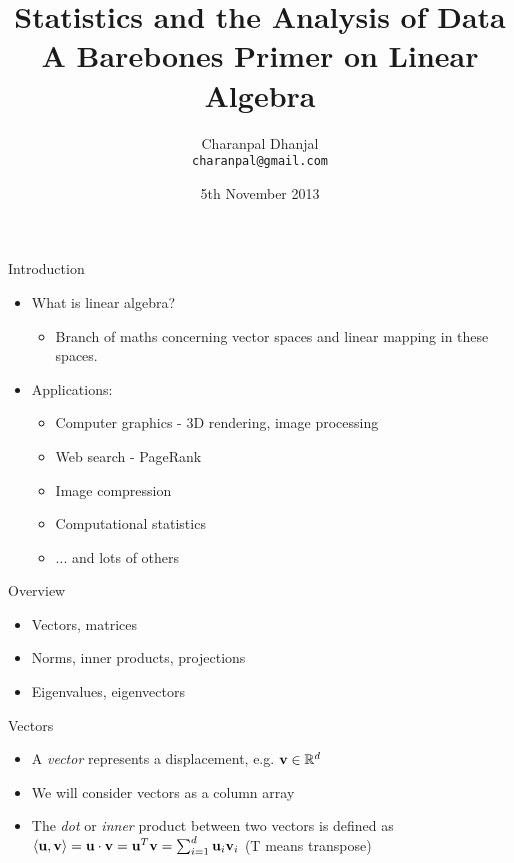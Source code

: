 \documentclass{beamer}
\title{Statistics and the Analysis of Data\\ A Barebones Primer on Linear Algebra}
\author{Charanpal Dhanjal \\ \texttt{charanpal@gmail.com}}
\institute{\'{E}cole des Ponts}
\date{5th November 2013}
\begin{document}
\frame{\titlepage}

\begin{frame}{Introduction}
\begin{itemize} 
 \item What is linear algebra? 
 \begin{itemize}
 \item Branch of maths concerning vector spaces and linear mapping in these spaces. 
 \end{itemize} 
 \item Applications: 
 \begin{itemize}
 \item Computer graphics - 3D rendering, image processing  
 \item Web search - PageRank
 \item Image compression 
 \item Computational statistics 
 \item ... and lots of others 
 \end{itemize} 
\end{itemize}
\end{frame}

\begin{frame}{Overview} 
\begin{itemize}
 \item Vectors, matrices 
 \item Norms, inner products, projections  
 \item Eigenvalues, eigenvectors 
\end{itemize} 
\end{frame}

\begin{frame}{Vectors}
\begin{itemize} 
 \item A \emph{vector} represents a displacement, e.g. $\textbf{v} \in \mathbb{R}^d$ 
 \item We will consider vectors as a column array 
 \item The \emph{dot} or \emph{inner} product between two vectors is defined as $\langle \textbf{u}, \textbf{v} \rangle = \textbf{u} \cdot \textbf{v} = \textbf{u}^T\textbf{v} = \sum_{i=1}^d \textbf{u}_i\textbf{v}_i$ (T means transpose)
 
\end{itemize}
\end{frame}
\end{document}
